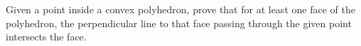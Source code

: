 Given a point inside a convex polyhedron,
prove that for at least one face of the polyhedron,
the perpendicular line to that face passing through the given point
intersects the face.
